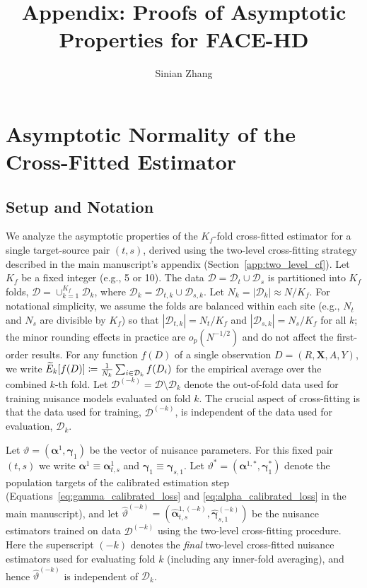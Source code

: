 \documentclass{article}
\begin{document}
\title{Appendix: Proofs of Asymptotic Properties for FACE-HD}
\author{Sinian Zhang}
\date{}
\maketitle

\appendix

\section{Asymptotic Normality of the Cross-Fitted Estimator}
\subsection{Setup and Notation}

We analyze the asymptotic properties of the $K_f$-fold cross-fitted estimator for a single target-source pair $(t, s)$, derived using the two-level cross-fitting strategy described in the main manuscript's appendix (Section~\ref{app:two_level_cf}).
Let $K_f$ be a fixed integer (e.g., 5 or 10). The data $\mathcal{D} = \mathcal{D}_t \cup \mathcal{D}_s$ is partitioned into $K_f$ folds, $\mathcal{D} = \cup_{k=1}^{K_f} \mathcal{D}_k$, where $\mathcal{D}_k = \mathcal{D}_{t,k} \cup \mathcal{D}_{s,k}$. Let $N_k = |\mathcal{D}_k| \approx N/K_f$.
For notational simplicity, we assume the folds are balanced within each site (e.g., $N_t$ and $N_s$ are divisible by $K_f$) so that $|\mathcal{D}_{t,k}|=N_t/K_f$ and $|\mathcal{D}_{s,k}|=N_s/K_f$ for all $k$; the minor rounding effects in practice are $o_p(N^{-1/2})$ and do not affect the first-order results.
For any function $f(D)$ of a single observation $D=(R,\boldsymbol{X},A,Y)$, we write $\widetilde{E}_k[f(D)] \coloneqq \frac{1}{N_k}\sum_{i \in \mathcal{D}_k} f(D_i)$ for the empirical average over the combined $k$-th fold.
Let $\mathcal{D}^{(-k)} = \mathcal{D} \setminus \mathcal{D}_k$ denote the out-of-fold data used for training nuisance models evaluated on fold $k$. The crucial aspect of cross-fitting is that the data used for training, $\mathcal{D}^{(-k)}$, is independent of the data used for evaluation, $\mathcal{D}_k$.

Let $\vartheta = (\boldsymbol{\alpha}^1, \boldsymbol{\gamma}_1)$ be the vector of nuisance parameters. For this fixed pair $(t,s)$ we write $\boldsymbol{\alpha}^1 \equiv \boldsymbol{\alpha}_{t,s}^1$ and $\boldsymbol{\gamma}_1 \equiv \boldsymbol{\gamma}_{s,1}$. Let $\vartheta^* = (\boldsymbol{\alpha}^{1,*}, \boldsymbol{\gamma}_1^*)$ denote the population targets of the calibrated estimation step (Equations~\eqref{eq:gamma_calibrated_loss} and \eqref{eq:alpha_calibrated_loss} in the main manuscript), and let $\widehat{\vartheta}^{(-k)} = (\widehat{\boldsymbol{\alpha}}_{t,s}^{1,(-k)}, \widehat{\boldsymbol{\gamma}}_{s,1}^{(-k)})$ be the nuisance estimators trained on data $\mathcal{D}^{(-k)}$ using the two-level cross-fitting procedure.
Here the superscript $(-k)$ denotes the \emph{final} two-level cross-fitted nuisance estimators used for evaluating fold $k$ (including any inner-fold averaging), and hence $\widehat{\vartheta}^{(-k)}$ is independent of $\mathcal{D}_k$.
\end{document}

